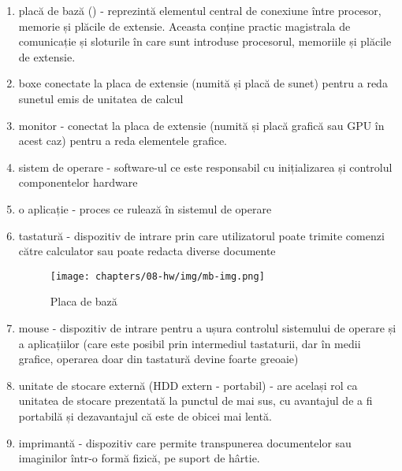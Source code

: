 \begin{enumerate}

    \item placă de bază () - reprezintă elementul central de conexiune între
		procesor, memorie și plăcile de extensie. Aceasta conține
		practic magistrala de comunicație și sloturile în care sunt
		introduse procesorul, memoriile și plăcile de extensie.

	\item boxe conectate la placa de extensie (numită și placă de sunet)
		pentru a reda sunetul emis de unitatea de calcul
	\item monitor - conectat la placa de extensie (numită și placă grafică
		sau GPU  în acest caz)
		pentru a reda elementele grafice.
	\item sistem de operare - software-ul ce este responsabil cu
		inițializarea și controlul componentelor hardware
	\item o aplicație - proces ce rulează în sistemul de operare
	\item tastatură - dispozitiv de intrare prin care utilizatorul poate trimite
		comenzi către calculator sau poate redacta diverse documente
			
\begin{figure}[!htbp]
	\centering
	\texttt{[image: chapters/08-hw/img/mb-img.png]}
	\caption{Placa de bază\protect\footnotemark}
	\label{fig:hw:mb}
\end{figure}


	\item mouse - dispozitiv de intrare pentru a ușura controlul sistemului
		de operare și a aplicațiilor (care este posibil prin intermediul
		tastaturii, dar în medii grafice, operarea doar din tastatură
		devine foarte greoaie)
	\item unitate de stocare externă (HDD extern - portabil) - are
		același rol ca unitatea de stocare prezentată la punctul de mai sus,
		cu avantajul de a fi portabilă și dezavantajul că este de obicei
		mai lentă.
	\item imprimantă - dispozitiv care permite transpunerea documentelor
		sau imaginilor într-o formă fizică, pe suport de hârtie.

\end{enumerate}

